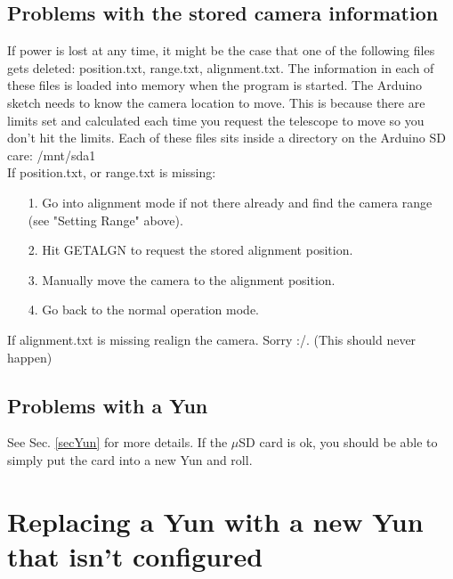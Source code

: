 \documentclass[11pt]{article}
\begin{document}
\subsection{Problems with the stored camera information}

If power is lost at any time, it might be the case that one of the following files gets deleted: position.txt, range.txt, alignment.txt. 
The information in each of these files is loaded into memory when the program is started.
The Arduino sketch needs to know the camera location to move.
This is because there are limits set and calculated each time you request the telescope to move so you don't hit the limits.
Each of these files sits inside a directory on the Arduino SD care: /mnt/sda1\\[15pt]

If position.txt, or range.txt is missing:
\begin{enumerate}
\item[1.] Go into alignment mode if not there already and find the camera range (see "Setting Range" above).
\item[2.] Hit GETALGN to request the stored alignment position.
\item[3.] Manually move the camera to the alignment position.
\item[4.] Go back to the normal operation mode.
\end{enumerate}
If alignment.txt is missing realign the camera. Sorry :/. (This should never happen)

\subsection{Problems with a Yun}
See Sec. \ref{secYun} for more details.
If the $\mu$SD card is ok, you should be able to simply put the card into a new Yun and roll.


\section{Replacing a Yun with a new Yun that isn't configured}
\end{document}
